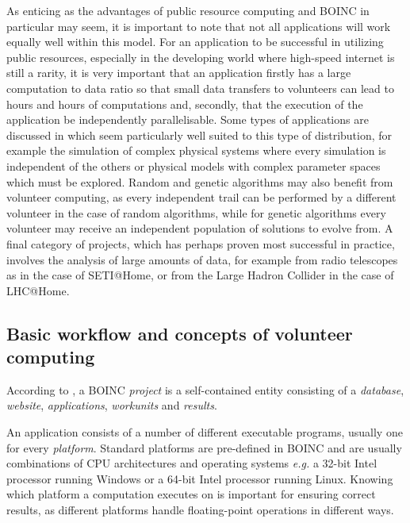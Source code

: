 As enticing as  the advantages of public resource computing and BOINC in particular may seem, it is important to note that not all applications will work equally well within this model. For an application to be successful in  utilizing public resources, especially in the developing world where high-speed internet is still a rarity,  it is very important that an application firstly has a large computation to data ratio so that small data transfers to volunteers can lead to hours and hours of computations and, secondly, that the execution of the application be independently parallelisable. Some types of applications are discussed in \cite{anderson:pc} which seem particularly well suited to this type of distribution, for example the simulation of complex physical systems  where every simulation is independent of the others  or physical models with complex parameter spaces which must be explored. Random and genetic algorithms may also benefit from volunteer computing, as every independent trail can be performed by a different volunteer in the case of random algorithms, while for genetic algorithms every volunteer may receive an independent population of solutions to evolve from. A final category of projects, which has perhaps proven most successful in practice, involves the analysis of large amounts of data, for example from radio telescopes as in the case of SETI@Home, or  from the Large Hadron Collider in the case of LHC@Home.

 \subsection{Basic workflow and concepts of volunteer computing}

 
According to \cite{boincwiki}, a BOINC \emph{project} is a self-contained entity consisting of a \emph{database}, \emph{website}, \emph{applications}, \emph{workunits} and \emph{results}.

An application consists of a number of different executable programs, usually one for every \emph{platform}. Standard platforms are pre-defined in BOINC and are usually combinations of CPU architectures and operating systems \emph{e.g.} a 32-bit Intel processor running Windows or a 64-bit Intel processor running Linux. Knowing which platform a computation executes on is important for ensuring correct results, as different platforms handle floating-point operations in different ways.

